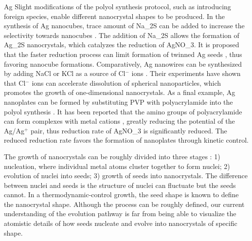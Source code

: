 Ag
Slight modifications of the polyol synthesis protocol, such as introducing foreign species, enable different nanocrystal shapes to be produced.
In the synthesis of Ag nanocubes, trace amount of Na_2S can be added to increase the selectivity towards nanocubes \cite{Skrabalak_2007}.
The addition of Na_2S allows the formation of Ag_2S nanocrystals, which catalyzes the reduction of AgNO_3.
It is proposed that the faster reduction process can limit formation of twinned Ag seeds \cite{Wiley_2006}, thus favoring nanocube formations.
Comparatively, Ag nanowires can be synthesized by adding NaCl or KCl as a source of Cl$^-$ ions \cite{Tsuji_2008}.
Their experiments have shown that Cl$^-$ ions can accelerate dissolution of spherical nanoparticles, which promotes the growth of one-dimensional nanocrystals.
As a final example, Ag nanoplates can be formed by substituting PVP with polyacrylamide into the polyol synthesis \cite{Xiong_2007}.
It has been reported that the amino groups of polyacrylamide can form complexes with metal cations \cite{Sari_2006}, greatly reducing the potential of the Ag/Ag$^+$ pair, thus reduction rate of AgNO_3 is significantly reduced.
The reduced reduction rate favors the formation of nanoplates through kinetic control.

The growth of nanocrystals can be roughly divided into three stages \cite{Xia_2008}:
1) nucleation, where individual metal atoms cluster together to form nuclei;
2) evolution of nuclei into seeds;
3) growth of seeds into nanocrystals.
The difference between nuclei and seeds is the structure of nuclei can fluctuate but the seeds cannot.
In a thermodynamic-control growth, the seed shape is known to define the nanocrystal shape.
Although the process can be roughly defined, our current understanding of the evolution pathway is far from being able to visualize the atomistic details of how seeds nucleate and evolve into nanocrystals of specific shape.
  